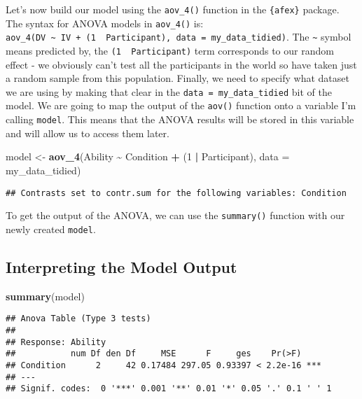 \documentclass[
]{book}
\newenvironment{Shaded}{\begin{snugshade}}{\end{snugshade}}
\newcommand{\AttributeTok}[1]{\textcolor[rgb]{0.13,0.29,0.53}{#1}}
\newcommand{\DecValTok}[1]{\textcolor[rgb]{0.00,0.00,0.81}{#1}}
\newcommand{\FunctionTok}[1]{\textcolor[rgb]{0.13,0.29,0.53}{\textbf{#1}}}
\newcommand{\NormalTok}[1]{#1}
\newcommand{\OtherTok}[1]{\textcolor[rgb]{0.56,0.35,0.01}{#1}}
\newcommand{\SpecialCharTok}[1]{\textcolor[rgb]{0.81,0.36,0.00}{\textbf{#1}}}
\begin{document}
Let's now build our model using the \texttt{aov\_4()} function in the \texttt{\{afex\}} package. The syntax for ANOVA models in \texttt{aov\_4()} is: \texttt{aov\_4(DV\ \textasciitilde{}\ IV\ +\ (1\ \textbar{}\ Participant),\ data\ =\ my\_data\_tidied)}. The \texttt{\textasciitilde{}} symbol means predicted by, the \texttt{(1\ \textbar{}\ Participant)} term corresponds to our random effect - we obviously can't test all the participants in the world so have taken just a random sample from this population. Finally, we need to specify what dataset we are using by making that clear in the \texttt{data\ =\ my\_data\_tidied} bit of the model. We are going to map the output of the \texttt{aov()} function onto a variable I'm calling \texttt{model}. This means that the ANOVA results will be stored in this variable and will allow us to access them later.

\begin{Shaded}
\begin{Highlighting}[]
\NormalTok{model }\OtherTok{\textless{}{-}} \FunctionTok{aov\_4}\NormalTok{(Ability }\SpecialCharTok{\textasciitilde{}}\NormalTok{ Condition }\SpecialCharTok{+}\NormalTok{ (}\DecValTok{1} \SpecialCharTok{|}\NormalTok{ Participant), }\AttributeTok{data =}\NormalTok{ my\_data\_tidied)}
\end{Highlighting}
\end{Shaded}

\begin{verbatim}
## Contrasts set to contr.sum for the following variables: Condition
\end{verbatim}

To get the output of the ANOVA, we can use the \texttt{summary()} function with our newly created \texttt{model}.

\hypertarget{interpreting-the-model-output}{%
\subsection{Interpreting the Model Output}\label{interpreting-the-model-output}}

\begin{Shaded}
\begin{Highlighting}[]
\FunctionTok{summary}\NormalTok{(model)}
\end{Highlighting}
\end{Shaded}

\begin{verbatim}
## Anova Table (Type 3 tests)
## 
## Response: Ability
##           num Df den Df     MSE      F     ges    Pr(>F)    
## Condition      2     42 0.17484 297.05 0.93397 < 2.2e-16 ***
## ---
## Signif. codes:  0 '***' 0.001 '**' 0.01 '*' 0.05 '.' 0.1 ' ' 1
\end{verbatim}
\end{document}
